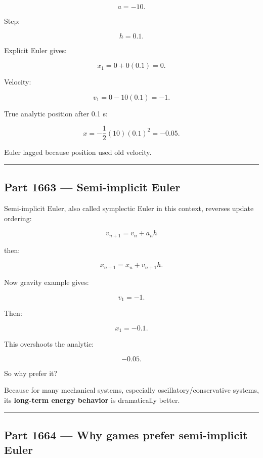 \[
a=-10.
\]

Step:

\[
h=0.1.
\]

Explicit Euler gives:

\[
x_1
=
0+0(0.1)
=
0.
\]

Velocity:

\[
v_1
=
0-10(0.1)
=
-1.
\]

True analytic position after 0.1 s:

\[
x=-\frac12(10)(0.1)^2=-0.05.
\]

Euler lagged because position used old velocity.

\begin{center}\rule{0.5\linewidth}{0.5pt}\end{center}

\subsection{Part 1663 --- Semi-implicit Euler}\label{06-engine-ii-ch037-part-1663-semi-implicit-euler}

\hypertarget{06-engine-ii-ch037-part-1663-semi-implicit-euler}{}

Semi-implicit Euler, also called symplectic Euler in this context, reverses update ordering:

\[
\boxed{
v_{n+1}
=
v_n+a_nh
}
\]

then:

\[
\boxed{
x_{n+1}
=
x_n+v_{n+1}h.
}
\]

Now gravity example gives:

\[
v_1=-1.
\]

Then:

\[
x_1=-0.1.
\]

This overshoots the analytic:

\[
-0.05.
\]

So why prefer it?

Because for many mechanical systems, especially oscillatory/conservative systems, its \textbf{long-term energy behavior} is dramatically better.

\begin{center}\rule{0.5\linewidth}{0.5pt}\end{center}

\subsection{Part 1664 --- Why games prefer semi-implicit Euler}\label{06-engine-ii-ch037-part-1664-why-games-prefer-semi-implicit-euler}

